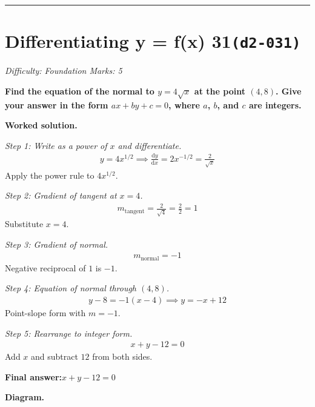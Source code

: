 \documentclass[11pt]{article}
\newcommand{\question}[1]{\par\medskip\noindent\textbf{#1}\par}
\begin{document}
\medskip\hrule

\section*{Differentiating y = f(x) 31\quad\small\texttt{(d2-031)}}
\textit{Difficulty: Foundation \quad\textbar\quad Marks: 5}

\question{Find the equation of the normal to \( y = 4\sqrt{x} \) at the point \( (4, 8) \). Give your answer in the form \( ax + by + c = 0 \), where \( a \), \( b \), and \( c \) are integers.}

\textbf{Worked solution.}

\textit{Step 1: Write as a power of \( x \) and differentiate.}
\[\begin{gathered}
y = 4x^{1/2} \implies \frac{\mathrm{d}y}{\mathrm{d}x} = 2x^{-1/2} = \frac{2}{\sqrt{x}}
\end{gathered}\]
Apply the power rule to \( 4x^{1/2} \).

\textit{Step 2: Gradient of tangent at \( x = 4 \).}
\[\begin{gathered}
m_{\text{tangent}} = \frac{2}{\sqrt{4}} = \frac{2}{2} = 1
\end{gathered}\]
Substitute \( x = 4 \).

\textit{Step 3: Gradient of normal.}
\[\begin{gathered}
m_{\text{normal}} = -1
\end{gathered}\]
Negative reciprocal of \(1\) is \(-1\).

\textit{Step 4: Equation of normal through \( (4, 8) \).}
\[\begin{gathered}
y - 8 = -1(x - 4) \implies y = -x + 12
\end{gathered}\]
Point-slope form with \( m = -1 \).

\textit{Step 5: Rearrange to integer form.}
\[\begin{gathered}
x + y - 12 = 0
\end{gathered}\]
Add \( x \) and subtract \( 12 \) from both sides.

\begin{answerbox}
\textbf{Final answer:}\quad \(\displaystyle  x + y - 12 = 0 \)
\end{answerbox}
\textbf{Diagram.}
\end{document}
